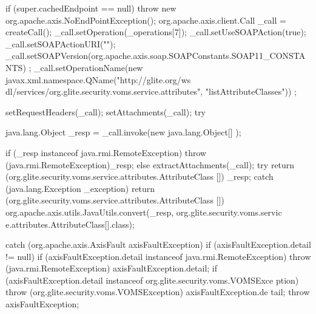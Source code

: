 \begin{DoxyCode}
                                                                                 
                                                                                       
         {
        if (super.cachedEndpoint == null) {
            throw new org.apache.axis.NoEndPointException();
        }
        org.apache.axis.client.Call _call = createCall();
        _call.setOperation(_operations[7]);
        _call.setUseSOAPAction(true);
        _call.setSOAPActionURI("");
        _call.setSOAPVersion(org.apache.axis.soap.SOAPConstants.SOAP11_CONSTANTS)
      ;
        _call.setOperationName(new javax.xml.namespace.QName("http://glite.org/ws
      dl/services/org.glite.security.voms.service.attributes", "listAttributeClasses"))
      ;

        setRequestHeaders(_call);
        setAttachments(_call);
 try {        java.lang.Object _resp = _call.invoke(new java.lang.Object[] {});

        if (_resp instanceof java.rmi.RemoteException) {
            throw (java.rmi.RemoteException)_resp;
        }
        else {
            extractAttachments(_call);
            try {
                return (org.glite.security.voms.service.attributes.AttributeClass
      []) _resp;
            } catch (java.lang.Exception _exception) {
                return (org.glite.security.voms.service.attributes.AttributeClass
      []) org.apache.axis.utils.JavaUtils.convert(_resp, org.glite.security.voms.servic
      e.attributes.AttributeClass[].class);
            }
        }
  } catch (org.apache.axis.AxisFault axisFaultException) {
    if (axisFaultException.detail != null) {
        if (axisFaultException.detail instanceof java.rmi.RemoteException) {
              throw (java.rmi.RemoteException) axisFaultException.detail;
         }
        if (axisFaultException.detail instanceof org.glite.security.voms.VOMSExce
      ption) {
              throw (org.glite.security.voms.VOMSException) axisFaultException.de
      tail;
         }
   }
  throw axisFaultException;
}
    }
\end{DoxyCode}
